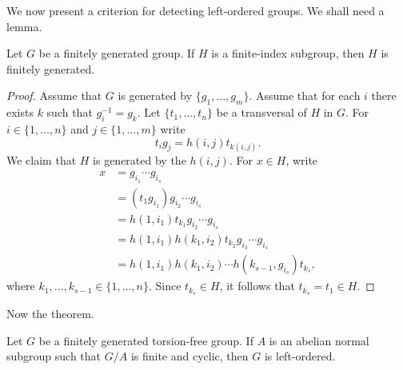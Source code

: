 \begin{graybox}
%

We now present a criterion for detecting left-ordered groups. We shall need 
a lemma. 

\begin{lemma}
	\label{lem:fg}
	Let $G$ be a finitely generated group. If $H$ is a finite-index subgroup, 
	then $H$ is finitely generated. 
\end{lemma}

\begin{proof}
	Assume that $G$ is generated by $\{g_1,\dots,g_m\}$. Assume that
	for each $i$ there exists $k$ such that $g_i^{-1}=g_k$. Let $\{t_1,\dots,t_n\}$ be
	a transversal of $H$ in $G$. For $i\in\{1,\dots,n\}$ and 
	$j\in\{1,\dots,m\}$ write 
	\[
		t_ig_j=h(i,j)t_{k(i,j)}.
	\]
	We claim that $H$ is generated by the $h(i,j)$. For $x\in H$, write 
	\begin{align*}
	x &=g_{i_1}\cdots g_{i_s}\\
	&= (t_1g_{i_1})g_{i_2}\cdots g_{i_s}\\
	&= h(1,i_1)t_{k_1}g_{i_2}\cdots g_{i_s}\\
	&= h(1,i_1)h(k_1,i_2)t_{k_2}g_{i_3}\cdots g_{i_s}\\
	&= h(1,i_1)h(k_1,i_2)\cdots h(k_{s-1},g_{i_s})t_{k_s},
	\end{align*}
	where $k_1,\dots,k_{s-1}\in\{1,\dots,n\}$. Since $t_{k_s}\in H$, it follows that 
	$t_{k_s}=t_1\in H$.
\end{proof}

Now the theorem.

\begin{theorem}
	Let $G$ be a finitely generated torsion-free group. If $A$ is an abelian normal
	subgroup such that $G/A$ is finite and cyclic, then $G$ is left-ordered. 
\end{theorem}


\end{graybox}
